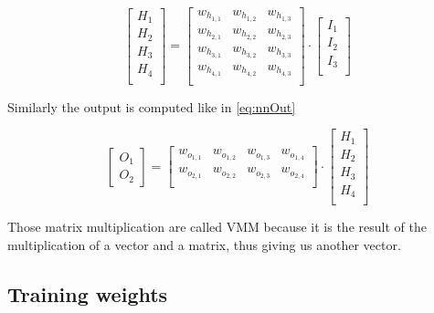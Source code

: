 \begin{equation}\label{eq:nnHid}
  \begin{bmatrix}
    H_1\\ H_2\\ H_3\\ H_4\\
  \end{bmatrix}
  =
  \begin{bmatrix}
    w_h_{1,1} & w_h_{1,2} & w_h_{1,3}\\
    w_h_{2,1} & w_h_{2,2} & w_h_{2,3}\\
    w_h_{3,1} & w_h_{3,2} & w_h_{3,3}\\
    w_h_{4,1} & w_h_{4,2} & w_h_{4,3}\\
  \end{bmatrix}
  \cdot
  \begin{bmatrix}
    I_1\\ I_2\\ I_3\\
  \end{bmatrix}
\end{equation}

Similarly the output is computed like in \cref{eq:nnOut}

\begin{equation}\label{eq:nnOut}
  \begin{bmatrix}
    O_1\\ O_2
  \end{bmatrix}
  =
  \begin{bmatrix}
    w_o_{1,1} & w_o_{1,2} & w_o_{1,3} & w_o_{1,4}\\
    w_o_{2,1} & w_o_{2,2} & w_o_{2,3} & w_o_{2,4}\\
  \end{bmatrix}
  \cdot
  \begin{bmatrix}
    H_1\\ H_2\\ H_3\\ H_4\\
  \end{bmatrix}
\end{equation}

Those matrix multiplication are called \ac{VMM} because it is the result of the multiplication of a vector and a matrix, thus giving us another vector.

\subsection{Training weights}

